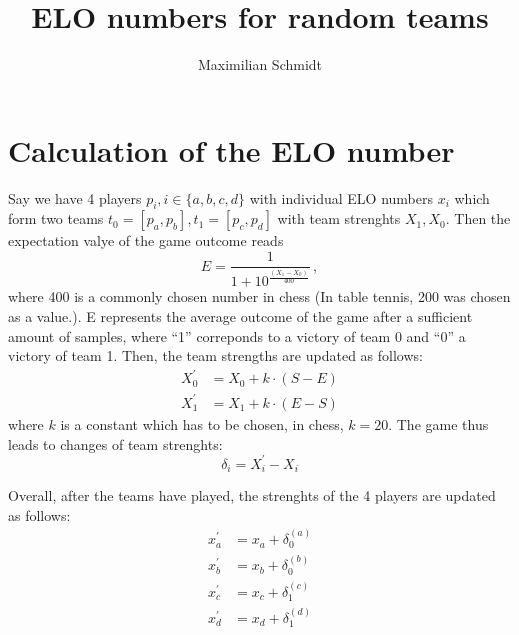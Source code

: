 \documentclass[a4paper,10pt]{article}
\title{ELO numbers for random teams}
\author{Maximilian Schmidt}
\begin{document}
\maketitle

\tableofcontents

\section{Calculation of the ELO number}
Say we have 4 players $p_i, i \in \{a,b,c,d \}$ with individual ELO numbers $x_i$ which form two teams $t_0 = [p_a, p_b], t_1 = [p_c,p_d]$ with team strenghts $X_1,X_0$.  Then the expectation valye of the game outcome reads
\begin{equation}
  E = \frac{1}{1+10^{\frac{(X_1-X_0)}{400}}}\, ,
\end{equation}
where 400 is a commonly chosen number in chess (In table tennis, 200 was chosen as a value.). E represents the average outcome of the game after a sufficient amount of samples, where ``1'' correponds to a victory of team 0 and ``0'' a victory of team 1.
Then, the team strengths are updated as follows:
\begin{eqnarray}
  X_0^{\prime} &= X_0 + k \cdot \left(S - E \right) \\
  X_1^{\prime} &= X_1 + k \cdot \left(E-S \right)
\label{eq:update}
\end{eqnarray}
where $k$ is a constant which has to be chosen, in chess, $k=20$. The game thus leads to changes of team strenghts:
\begin{equation}
  \delta_i = X_i^{\prime} - X_i
\end{equation}

Overall, after the teams have played, the strenghts of the 4 players are updated as follows:
\begin{eqnarray}
  x_a^{\prime} &= x_a + \delta_0^{(a)} \\
  x_b^{\prime} &= x_b + \delta_0^{(b)} \\
  x_c^{\prime} &= x_c + \delta_1^{(c)} \\
  x_d^{\prime} &= x_d + \delta_1^{(d)} 
\end{eqnarray}
\end{document}
